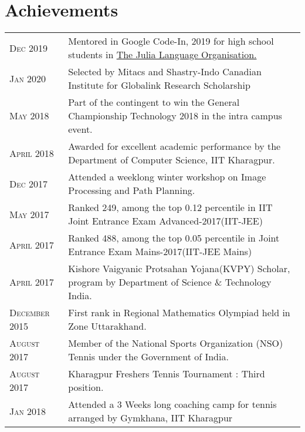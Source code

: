 \documentclass[a4paper,10pt]{extarticle} %
\begin{document}

\vspace{-0.3cm}
\section{\textcolor{primary}{Achievements}}

\begin{tabularx}{\linewidth}{ l | X }


\textsc{Dec 2019} & Mentored in Google Code-In, 2019 for high school students in \href{https://codein.withgoogle.com/organizations/the-julia-programming-language/}{The Julia Language Organisation.} \\
\textsc{Jan 2020} & Selected by Mitacs and Shastry-Indo Canadian Institute for Globalink Research Scholarship \\
\textsc{May 2018} & Part of the contingent to win the General Championship Technology 2018 in the intra campus event. \\
\textsc{April 2018} & Awarded for excellent academic performance by the Department of Computer Science, IIT Kharagpur. \\
\textsc{Dec 2017} & Attended a weeklong winter workshop on Image Processing and Path Planning. \\
\textsc{May 2017} & Ranked 249, among the top 0.12 percentile in IIT Joint Entrance Exam Advanced-2017(IIT-JEE) \\
\textsc{April 2017} & Ranked 488, among the top 0.05 percentile in Joint Entrance Exam Mains-2017(IIT-JEE Mains) \\
\textsc{April 2017} & Kishore Vaigyanic Protsahan Yojana(KVPY) Scholar, program by Department of Science \& Technology India.\\
\textsc{December 2015} & First rank in Regional Mathematics Olympiad held in Zone Uttarakhand. \\
\textsc{August 2017} & Member of the National Sports Organization (NSO) Tennis under the Government of India. \\
\textsc{August 2017} & Kharagpur Freshers Tennis Tournament : Third position. \\
\textsc{Jan 2018} & Attended a 3 Weeks long coaching camp for tennis arranged by Gymkhana, IIT Kharagpur
\end{tabularx}
\end{document}
